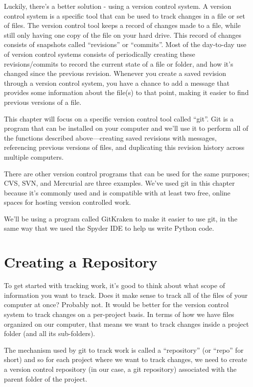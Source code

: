 \documentclass[]{Nemilov}
\begin{document}
Luckily, there's a better solution - using a version control system. A version
control system is a specific tool that can be used to track changes
in a file or set of files. The version control tool keeps a record
of changes made to a file, while still only having one copy of the file on
your hard drive. This record of changes consists of snapshots called
``revisions'' or ``commits''. Most of the day-to-day use of version control
systems consists of periodically creating these revisions/commits to record
the current state of a file
or folder, and how it's changed since the previous revision.
Whenever you create a saved revision through
a version control system, you have a chance to add a message that provides some
information about the file(s) to that point, making it easier to find previous
versions of a file.

This chapter will focus on a specific version control tool called ``git''. Git
is a program that can be installed on your computer and we'll use it to perform
all of the functions described above---creating saved revisions with messages,
referencing previous versions of files, and duplicating this revision history
across multiple computers.

There are other version control programs that can be used for the same purposes; CVS, SVN, and Mercurial are three examples. We've used git in this
chapter because it's commonly used and is compatible with at least two free,
online spaces for hosting version controlled work.

We'll be using a program called GitKraken to make it easier to use git, in the
same way that we used the Spyder IDE to help us write Python code.

\hypertarget{py-version-control-repo}{%
\section{Creating a Repository}\label{py-version-control-repo}}

To get started with tracking work, it's good to think about what scope of
information you want to track. Does it make sense to track all of the files of your
computer at once? Probably not. It would be better for the version control system to
track changes on a per-project basis. In terms of how we have files
organized on our computer, that means we want to track changes inside a project
folder (and all its sub-folders).

The mechanism used by git to track work is called a ``repository'' (or ``repo'' for
short) and so for each project where we want to track changes, we need to create a
version control repository (in our case, a git repository) associated
with the parent folder of the project.
\end{document}
